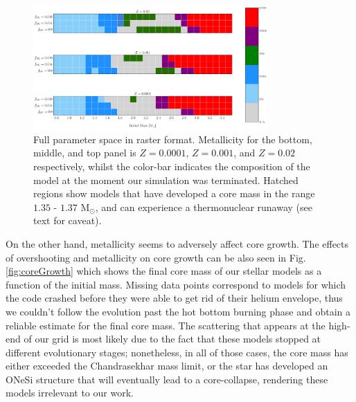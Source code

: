 \documentclass[../../main/thesis_msc.tex]{subfiles}
\begin{document}
    
   \begin{figure}[ht]
        \centering
        \includegraphics[width=0.8\textwidth]{../figures/chapter4/parameterSpaceRaster.png}
        \caption{Full parameter space in raster format. Metallicity for the bottom, middle, and top panel is $Z=0.0001$, $Z=0.001$, and $Z=0.02$ respectively, whilst the color-bar indicates the composition of the model at the moment our simulation was terminated. Hatched regions show models that have developed a core mass in the range $1.35$ - $1.37$ M$_{\odot}$, and can experience a thermonuclear runaway (see text for caveat).}
        \label{fig:parameterSpace}
    \end{figure}
    
    On the other hand, metallicity seems to adversely affect core growth. The effects of overshooting and metallicity on core growth can be also seen in Fig.\, \ref{fig:coreGrowth} which shows the final core mass of our stellar models as a function of the initial mass. Missing data points correspond to models for which the code crashed before they were able to get rid of their helium envelope, thus we couldn't follow the evolution past the hot bottom burning phase and obtain a reliable estimate for the final core mass. The scattering that appears at the high-end of our grid is most likely due to the fact that these models stopped at different evolutionary stages; nonetheless, in all of those cases, the core mass has either exceeded the Chandrasekhar mass limit, or the star has developed an ONeSi structure that will eventually lead to a core-collapse, rendering these models irrelevant to our work.
    
\end{document}
